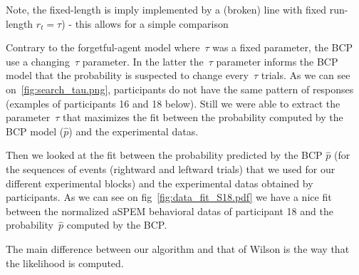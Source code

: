 \documentclass[profile,final,english, draft]{article}%
\begin{document}
Note, the fixed-length is imply implemented by a (broken) line with fixed run-length $r_t=\tau$) - this allows for a simple comparison




Contrary to the forgetful-agent model where~$\tau$ was a fixed parameter, the BCP use a changing~$\tau$ parameter. In the latter the~$\tau$ parameter informs the BCP model that the probability is suspected to change every~$\tau$ trials. As we can see on~\ref{fig:search_tau.png}, participants do not have the same pattern of responses (examples of participants 16 and 18 below). Still we were able to extract the parameter~$\tau$ that maximizes the fit between the probability computed by the BCP model ($\hat{p}$) and the experimental datas.


\hfill \break
 Then we looked at the fit between the probability predicted by the BCP $\hat{p}$ (for the sequences of events (rightward and leftward trials) that we used for our different experimental blocks) and the experimental datas obtained by participants. As we can see on fig~\ref{fig:data_fit_S18.pdf} we have a nice fit between the normalized aSPEM behavioral datas of participant 18 and the probability~$\hat{p}$ computed by the BCP.




The main difference between our algorithm and that of Wilson is the way that the likelihood is computed.
\end{document}
